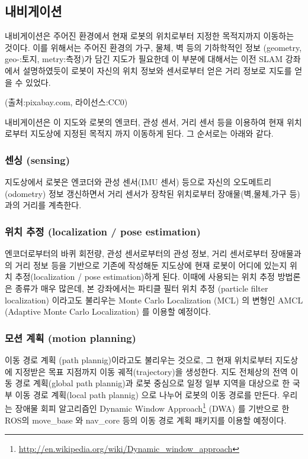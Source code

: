 \subsection{내비게이션}

내비게이션은 주어진 환경에서 현재 로봇의 위치로부터 지정한 목적지까지 이동하는 것이다. 이를 위해서는 주어진 환경의 가구, 물체, 벽 등의 기하학적인 정보 (geometry, geo-:토지, metry:측정)가 담긴 지도가 필요한데 이 부분에 대해서는 이전  SLAM 강좌에서 설명하였듯이 로봇이 자신의 위치 정보와 센서로부터 얻은 거리 정보로 지도를 얻을 수 있었다. 

(출처:pixabay.com, 라이선스:CC0)

내비게이션은 이 지도와 로봇의 엔코터, 관성 센서, 거리 센서 등을 이용하여 현재 위치로부터 지도상에 지정된 목적지 까지 이동하게 된다. 그 순서로는 아래와 같다.

\subsubsection{센싱 (sensing)}
지도상에서 로봇은 엔코더와 관성 센서(IMU 센서) 등으로 자신의 오도메트리(odometry) 정보 갱신하면서 거리 센서가 장착된 위치로부터 장애물(벽,물체,가구 등)과의 거리를 계측한다. 

\subsubsection{위치 추정 (localization / pose estimation)}
엔코더로부터의 바퀴 회전량, 관성 센서로부터의 관성 정보, 거리 센서로부터 장애물과의 거리 정보 등을 기반으로 기존에 작성해둔 지도상에 현재 로봇이 어디에 있는지 위치 추정(localization / pose estimation)하게 된다. 이때에 사용되는 위치 추정 방법론은 종류가 매우 많은데, 본 강좌에서는 파티클 필터 위치 추정 (particle filter localization) 이라고도 불리우는 Monte Carlo Localization (MCL) 의 변형인 AMCL (Adaptive Monte Carlo Localization)\cite{thrun2005probabilistic} 를 이용할 예정이다.

\subsubsection{모션 계획 (motion planning)}
이동 경로 계획 (path plannig)이라고도 불리우는 것으로, 그 현재 위치로부터 지도상에 지정받은 목표 지점까지 이동 궤적(trajectory)을 생성한다. 지도 전체상의 전역 이동 경로 계획(global path plannig)과 로봇 중심으로 일정 일부 지역을 대상으로 한 국부 이동 경로 계획(local path plannig) 으로 나누어 로봇의 이동 경로를 만든다. 우리는 장애물 회피 알고리즘인 Dynamic Window Approach\footnote{\url{http://en.wikipedia.org/wiki/Dynamic_window_approach}} (DWA) 를 기반으로 한 ROS의 move\_base 와 nav\_core 등의 이동 경로 계획 패키지를 이용할 예정이다.


